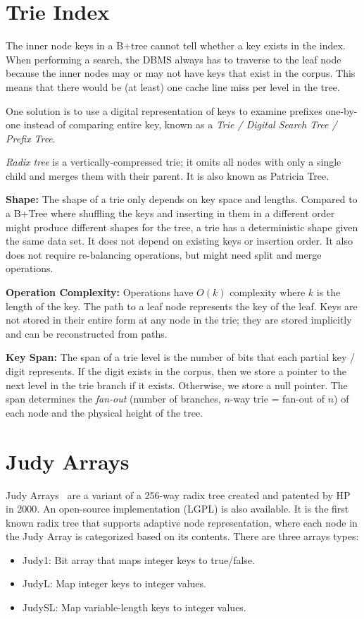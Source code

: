 \documentclass[11pt]{article}
\begin{document}
\section{Trie Index}
The inner node keys in a B+tree cannot tell whether a key exists in the index. When performing a search, the DBMS always has to traverse to the leaf node because the inner nodes may or may not have keys that exist in the corpus. This means that there would be (at least) one cache line miss per level in the tree.

One solution is to use a digital representation of keys to examine prefixes one-by-one instead of comparing entire key, known as a \textit{Trie / Digital Search Tree / Prefix Tree}.

\textit{Radix tree} is a vertically-compressed trie; it omits all nodes with only a single child and merges them with their parent. It is also known as Patricia Tree.

\textbf{Shape:} The shape of a trie only depends on key space and lengths. Compared to a B+Tree where shuffling the keys and inserting in them in a different order might produce different shapes for the tree, a trie has a deterministic shape given the same data set. It does not depend on existing keys or insertion order. It also does not require re-balancing operations, but might need split and merge operations.

\textbf{Operation Complexity:} Operations have $O(k)$ complexity where $k$ is the length of the key. The path to a leaf node represents the key of the leaf. Keys are not stored in their entire form at any node in the trie; they are stored implicitly and can be reconstructed from paths.

\textbf{Key Span:} The span of a trie level is the number of bits that each partial key / digit represents. If the digit exists in the corpus, then we store a pointer to the next level in the trie branch if it exists. Otherwise, we store a null pointer. The span determines the \textit{fan-out} (number of branches, $n$-way trie = fan-out of $n$) of each node and the physical height of the tree. 

\section{Judy Arrays}

Judy Arrays~\cite{7113370} are a variant of a 256-way radix tree created and patented by HP in 2000. An open-source implementation (LGPL) is also available. It is the first known radix tree that supports adaptive node representation, where each node in the Judy Array is categorized based on its contents.
There are three arrays types:
\begin{itemize}
    \item Judy1: Bit array that maps integer keys to true/false.
    \item JudyL: Map integer keys to integer values.
    \item JudySL: Map variable-length keys to integer values.
\end{itemize}
\end{document}
